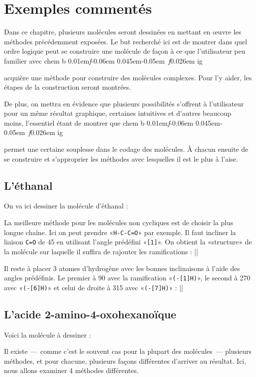 \documentclass[10pt,french]{article}
\makeatletter
\newcommand\make@car@active[1]{%
	\catcode`#1\active
	\begingroup
		\lccode`\~`#1\relax
		\lowercase{\endgroup\def~}%
}
\newif\if@exstar
\newcommand\exemple{%
	\begingroup
	\parskip\z@
	\@makeother\;\@makeother\!\@makeother\?\@makeother\:%
	\@ifstar{\@exstartrue\exemple@}{\@exstarfalse\exemple@}}
\newcommand\exemple@[2][65]{%
	\medbreak\noindent
	\begingroup
		\let\do\@makeother\dospecials
		\make@car@active\ { {}}%
		\make@car@active\^^M{\par\leavevmode}%
		\make@car@active\^^I{\space\space}%
		\make@car@active\,{\leavevmode\kern\z@\string,}%
		\make@car@active\-{\leavevmode\kern\z@\string-}%
		\make@car@active\>{\leavevmode\kern\z@\string>}%
		\make@car@active\<{\leavevmode\kern\z@\string<}%
		\exemple@@{#1}{#2}%
}
\newcommand\exemple@@[3]{%
	\def\@tempa##1#3{\exemple@@@{#1}{#2}{##1}}%
	\@tempa
}
\newcommand\exemple@@@[3]{%
	\xdef\the@code{#3}%
	\endgroup
	\if@exstar
		\begingroup
			\fboxrule0.4pt
			\let\breakboxparindent\z@
			\def\bkvz@bottom{\hrule\@height\fboxrule}%
			\let\bkvz@before@breakbox\relax
			\def\bkvz@set@linewidth{\advance\linewidth\dimexpr-2\fboxrule-2\fboxsep}%
			\def\bkvz@left{\vrule\@width\fboxrule\hskip\fboxsep}%
			\def\bkvz@right{\hskip\fboxsep\vrule\@width\fboxrule}%
			\def\bkvz@top{\hbox to \hsize{%
				\vrule\@width\fboxrule\@height\fboxrule
				\leaders\bkvz@bottom\hfill
				\sffamily
				\fboxsep\z@
				\colorbox{black}{\kern0.25em\color{white}\footnotesize\lower0.5ex\hbox{\strut#2}\kern0.25em}%
				\leaders\bkvz@bottom\hfill
				\vrule\@width\fboxrule\@height\fboxrule}}%
			\breakbox
				\kern.5ex\relax
				\ttfamily\footnotesize\the@code\par
				\normalfont
				\kern3pt
				\hrule height0.1pt width\linewidth depth0.1pt
				\vskip5pt
				\rightskip0pt plus 1fill
				\everypar{{\color{lightgray}\rlap{\vrule height0.1pt width\linewidth depth0.1pt}}\hskip0pt plus 1fill}%
				\newlinechar`\^^M\everyeof{\noexpand}\scantokens{#3}\par
			\endbreakbox
		\endgroup
	\else
		\vskip0.5ex
		\boxput*(0,1)
			{\fboxsep\z@
			\hbox{\sffamily\colorbox{black}{\leavevmode\kern0.25em{\color{white}\footnotesize\strut#2}\kern0.25em}}%
			}%
			{\fboxsep5pt
			\fbox{%
				$\vcenter{\hsize\dimexpr0.#1\linewidth-\fboxsep-\fboxrule\relax
					\kern5pt\parskip0pt \ttfamily\footnotesize\the@code}%
				\vcenter{\kern5pt\hsize\dimexpr\linewidth-0.#1\linewidth-\fboxsep-\fboxrule\relax
					\everypar{{\color{lightgray}\rlap{\vrule height0.1pt width\dimexpr\linewidth-0.#1\linewidth-\fboxsep-\fboxrule depth0.1pt}}}%
					\footnotesize\newlinechar`\^^M\everyeof{\noexpand}\scantokens{#3}}$%
				}%
			}%
	\fi
	\medbreak
	\endgroup
}
\let\do\@makeother\dospecials
\DeclareRobustCommand\CF{%
	\textsf{%
		chem%
		\if\string b\detokenize\expandafter{\f@series}%
			\lower0.01em\hbox{\itshape f}\kern-0.06em
		\else
			\lower0.045em\hbox{\kern-0.05em \itshape f}\kern0.026em
		\fi ig%
		}%
		\xspace
}
\makeatother
\begin{document}
\section{Exemples commentés}\label{exemples.commentes}
Dans ce chapitre, plusieurs molécules seront dessinées en mettant en œuvre les méthodes précédemment exposées. Le but recherché ici est de montrer dans quel ordre logique peut se construire une molécule de façon à ce que l'utilisateur peu familier avec \CF acquière une méthode pour construire des molécules complexes. Pour l'y aider, les étapes de la construction seront montrées.

De plus, on mettra en évidence que plusieurs possibilités s'offrent à l'utilisateur pour un même résultat graphique, certaines intuitives et d'autres beaucoup moins, l'essentiel étant de montrer que \CF permet une certaine souplesse dans le codage des molécules. À chacun ensuite de se construire et s'approprier les méthodes avec lesquelles il est le plus à l'aise.

\subsection{L'éthanal}
On va ici dessiner la molécule d'éthanal : 

La meilleure méthode pour les molécules non cycliques est de choisir la plus longue chaîne. Ici on peut prendre «\verb|H-C-C=O|» par exemple. Il faut incliner la liaison \verb|C=O| de 45\degres{} en utilisant l'angle prédéfini «\verb-[1]-». On obtient la «structure» de la molécule sur laquelle il suffira de rajouter les ramifications :
\exemple{Structure de l'éthanal}||

Il reste à placer 3 atomes d'hydrogène avec les bonnes inclinaisons à l'aide des angles prédéfinis. Le premier à 90\degres{} avec la ramification «\verb/(-[1]H)/», le second à 270\degres{} avec «\verb/(-[6]H)/» et celui de droite à 315\degres{} avec «\verb/(-[7]H)/» :
\exemple{Ethanal}||

\subsection{L'acide 2-amino-4-oxohexanoïque}
Voici la molécule à dessiner : 

Il existe ---~comme c'est le souvent cas pour la plupart des molécules~--- plusieurs méthodes, et pour chacune, plusieurs façons différentes d'arriver au résultat. Ici, nous allons examiner 4 méthodes différentes.
\end{document}
